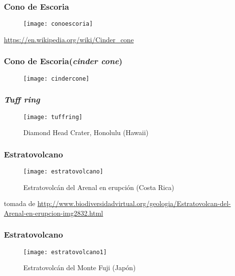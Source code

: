 \documentclass{beamer}
\begin{document}
\begin{frame}
\frametitle{Cono de Escoria}
\begin{figure}
\begin{center}
\texttt{[image: conoescoria]}
\end{center}
\end{figure}
\tiny{\url{https://en.wikipedia.org/wiki/Cinder_cone}}
\end{frame}
\begin{frame}
\frametitle{Cono de Escoria(\emph{cinder cone})}
\begin{figure}
\begin{center}
\texttt{[image: cindercone]}
\end{center}
\end{figure}
\end{frame}
\begin{frame}
\frametitle{\emph{Tuff ring}}
\begin{figure}
\begin{center}
\texttt{[image: tuffring]}
\caption{Diamond Head Crater, Honolulu (Hawaii)}
\end{center}
\end{figure}
\end{frame}
\begin{frame}
\frametitle{Estratovolcano}
\begin{figure}
\begin{center}
\texttt{[image: estratovolcano]}
\caption{Estratovolcán del Arenal en erupción (Costa Rica)}
\end{center}
\end{figure}
\tiny{tomada de \url{http://www.biodiversidadvirtual.org/geologia/Estratovolcan-del-Arenal-en-erupcion-img2832.html}}
\end{frame}
\begin{frame}
\frametitle{Estratovolcano}
\begin{figure}
\begin{center}
\texttt{[image: estratovolcano1]}
\caption{Estratovolcán del Monte Fuji (Japón)}
\end{center}
\end{figure}
\end{frame}
\end{document}
